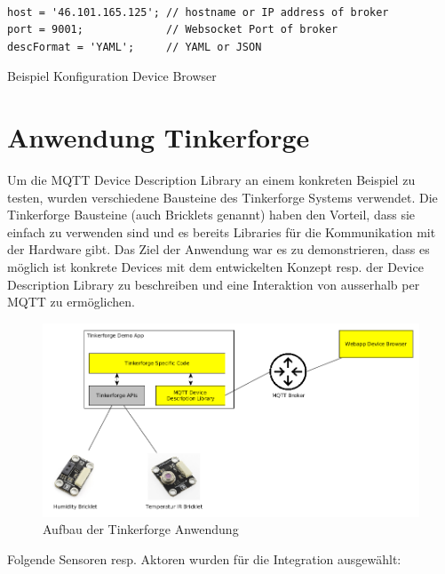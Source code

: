 {\begin{listing}[H]
\begin{verbatim}

host = '46.101.165.125'; // hostname or IP address of broker
port = 9001;             // Websocket Port of broker
descFormat = 'YAML';     // YAML or JSON

\end{verbatim}
\caption{Beispiel Konfiguration Device Browser}
\end{listing}



\section{Anwendung Tinkerforge} \label{ums:tinker}

Um die MQTT Device Description Library an einem konkreten Beispiel zu testen, wurden verschiedene Bausteine des Tinkerforge Systems verwendet. Die Tinkerforge Bausteine (auch Bricklets genannt) haben den Vorteil, dass sie einfach zu verwenden sind und es bereits Libraries für die Kommunikation mit der Hardware gibt. Das Ziel der Anwendung war es zu demonstrieren, dass es möglich ist konkrete Devices mit dem entwickelten Konzept resp. der Device Description Library zu beschreiben und eine Interaktion von ausserhalb per MQTT zu ermöglichen.

\begin{figure}[H]
	\centering
        \includegraphics[width=1.0\linewidth]{diag/tf_arch.png}
    \caption{Aufbau der Tinkerforge Anwendung}
\end{figure}

\newpage
Folgende Sensoren resp. Aktoren wurden für die Integration ausgewählt:

}
